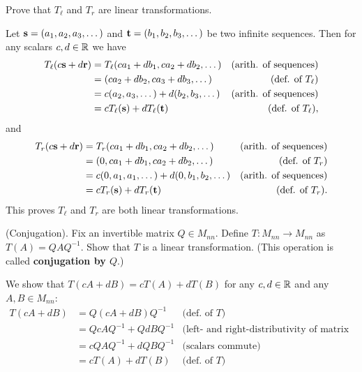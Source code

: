 Prove that $T_\ell$ and $T_r$ are linear transformations. 
\\
\begin{solution}
Let ${\mathbf s}=(a_1,a_2,a_3,\dots)$ and ${\mathbf t}=(b_1,b_2,b_3,\dots)$ be two infinite sequences. Then for any scalars $c,d\in{\mathbb R}$ we have 
\begin{align*}
T_\ell(c{\mathbf s}+d{\mathbf r})&=T_\ell(ca_1+db_1,ca_2+db_2,\dots) &\text{(arith. of sequences)}\\
&=(ca_2+db_2,ca_3+db_3,\dots) &\text{(def. of $T_\ell$)}\\
&=c(a_2,a_3,\dots)+d(b_2,b_3,\dots) &\text{(arith. of sequences)}\\
&=cT_\ell({\mathbf s})+dT_\ell({\mathbf t}) &\text{(def. of $T_\ell$)},
\end{align*}
and 
\begin{align*}
T_r(c{\mathbf s}+d{\mathbf r})&=T_r(ca_1+db_1,ca_2+db_2,\dots) &\text{(arith. of sequences)}\\
&=(0,ca_1+db_1,ca_2+db_2,\dots) &\text{(def. of $T_r$)}\\
&=c(0,a_1,a_1,\dots)+d(0,b_1,b_2,\dots) &\text{(arith. of sequences)}\\
&=cT_r({\mathbf s})+dT_r({\mathbf t}) &\text{(def. of $T_r$)}.
\end{align*}
This proves $T_\ell$ and $T_r$ are both linear transformations. 
\end{solution}


\ii (Conjugation). Fix an invertible matrix $Q\in M_{nn}$. Define $T\colon M_{nn}\rightarrow M_{nn}$ as $T(A)=QAQ^{-1}$. Show that $T$ is a linear transformation. (This operation is called {\bf conjugation by $Q$}.) 
\\
\begin{solution}
\noindent
We show that $T(cA+dB)=cT(A)+dT(B)$ for any $c,d\in{\mathbb R}$ and any $A,B\in M_{nn}$:
\begin{align*}
T(cA+dB)&=Q(cA+dB)Q^{-1} &\text{(def. of $T$)}\\
&=QcAQ^{-1}+QdBQ^{-1} &\text{(left- and right-distributivity of matrix mult.)}\\
&=cQAQ^{-1}+dQBQ^{-1} &\text{(scalars commute)}\\
&=cT(A)+dT(B) &\text{(def. of $T$)}
\end{align*}
\end{solution}

\ee